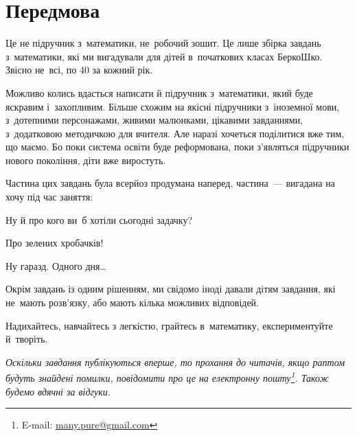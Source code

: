 \chapter*{Передмова}

Це не підручник з~математики, не~робочий зошит.
Це лише збірка завдань з~математики, які ми вигадували для дітей
в~початкових класах БеркоШко.
Звісно не~всі, по 40 за кожний рік.

Можливо колись вдасться написати й підручник з~математики,
який буде яскравим і~захопливим.
Більше схожим на якісні підручники з~іноземної мови, з~дотепними персонажами,
живими малюнками, цікавими завданнями, з~додатковою методичкою для вчителя.
Але наразі хочеться поділитися вже тим, що маємо.
Бо поки система освіти буде реформована, поки з’являться підручники
нового покоління, діти вже виростуть.

Частина цих завдань була всерйоз продумана наперед,
частина~--- вигадана на хочу під час заняття:
\begin{dialogue}
    \item Ну й про кого ви~б хотіли сьогодні задачку?
    \item Про зелених хробачків!
    \item Ну гаразд. Одного дня\ldots
\end{dialogue}

Окрім завдань із одним рішенням, ми свідомо іноді давали дітям завдання,
які не~мають розв’язку, або мають кілька можливих відповідей.

Надихайтесь, навчайтесь з легкістю, грайтесь в~математику,
експериментуйте й~творіть. \smiley

\medskip
\medskip

\emph{\small
Оскільки завдання публікуються вперше, то прохання до читачів,
якщо раптом будуть знайдені помилки,
повідомити про це на електронну пошту\footnote{
    E-mail: \url{many.pure@gmail.com}
}. Також будемо вдячні за відгуки.
}%
\smiley
